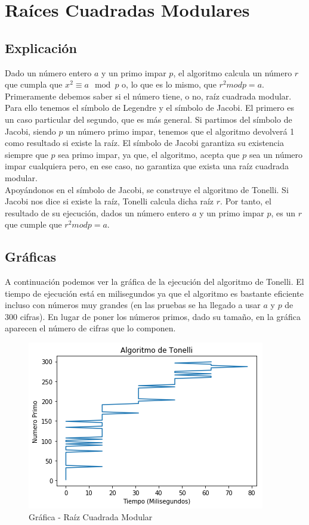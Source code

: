\documentclass[12pt,spanish]{article}
\begin{document}
	\section{Raíces Cuadradas Modulares}
	
		\subsection{Explicación}
		
Dado un número entero $a$ y un primo impar $p$, el algoritmo calcula un número $r$ que cumpla que $x^2 \equiv a \mod{p}$ o, lo que es lo mismo, que $r^2 mod p = a$.
\\
Primeramente debemos saber si el número tiene, o no, raíz cuadrada modular. Para ello tenemos el símbolo de Legendre y el símbolo de Jacobi. El primero es un caso particular del segundo, que es más general. Si partimos del símbolo de Jacobi, siendo $p$ un número primo impar, tenemos que el algoritmo devolverá 1 como resultado si existe la raíz. El símbolo de Jacobi garantiza su existencia siempre que $p$ sea primo impar, ya que, el algoritmo, acepta que $p$ sea un número impar cualquiera pero, en ese caso, no garantiza que exista una raíz cuadrada modular.
\\
Apoyándonos en el símbolo de Jacobi, se construye el algoritmo de Tonelli. Si Jacobi nos dice si existe la raíz, Tonelli calcula dicha raíz $r$. Por tanto, el resultado de su ejecución, dados un número entero $a$ y un primo impar $p$, es un $r$ que cumple que $r^2 mod p = a$.

		\subsection{Gráficas}
		
A continuación podemos ver la gráfica de la ejecución del algoritmo de Tonelli. El tiempo de ejecución está en milisegundos ya que el algoritmo es bastante eficiente incluso con números muy grandes (en las pruebas se ha llegado a usar $a$ y $p$ de 300 cifras). En lugar de poner los números primos, dado su tamaño, en la gráfica aparecen el número de cifras que lo componen.
\begin{figure}[!htbp]			
		\centering
		\includegraphics[width=.8\linewidth]{raiz_cuadrada}
		\caption{Gráfica - Raíz Cuadrada Modular}
	\label{fig:fig3}
\end{figure}
		
\end{document}
